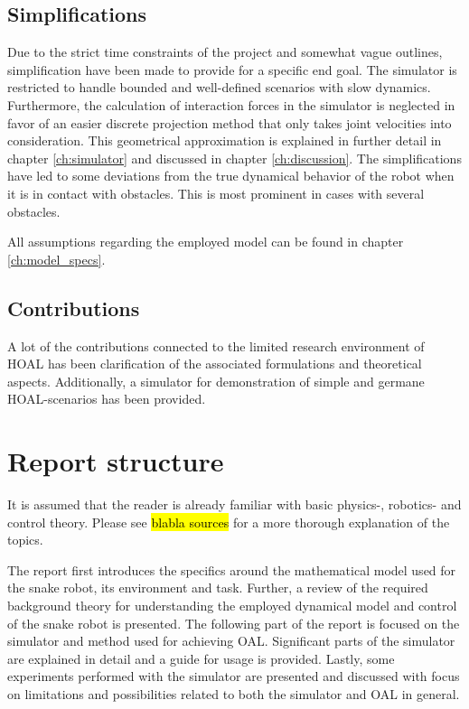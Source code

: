 \subsection{Simplifications}
Due to the strict time constraints of the project and somewhat vague outlines, simplification have been made to provide for a specific end goal. The simulator is restricted to handle bounded and well-defined scenarios with slow dynamics. Furthermore, the calculation of interaction forces in the simulator is neglected in favor of an easier discrete projection method that only takes joint velocities into consideration. This geometrical approximation is explained in further detail in chapter \ref{ch:simulator} and discussed in chapter \ref{ch:discussion}. The simplifications have led to some deviations from the true dynamical behavior of the robot when it is in contact with obstacles. This is most prominent in cases with several obstacles.

All assumptions regarding the employed model can be found in chapter \ref{ch:model_specs}.

\subsection{Contributions}
A lot of the contributions connected to the limited research environment of HOAL has been clarification of the associated formulations and theoretical aspects. Additionally, a simulator for demonstration of simple and germane HOAL-scenarios has been provided.



\section{Report structure}
It is assumed that the reader is already familiar with basic physics-, robotics- and control theory. Please see \hl{blabla sources} for a more thorough explanation of the topics.

The report first introduces the specifics around the mathematical model used for the snake robot, its environment and task. Further, a review of the required background theory for understanding the employed dynamical model and control of the snake robot is presented. The following part of the report is focused on the simulator and method used for achieving OAL. Significant parts of the simulator are explained in detail and a guide for usage is provided. Lastly, some experiments performed with the simulator are presented and discussed with focus on limitations and possibilities related to both the simulator and OAL in general.